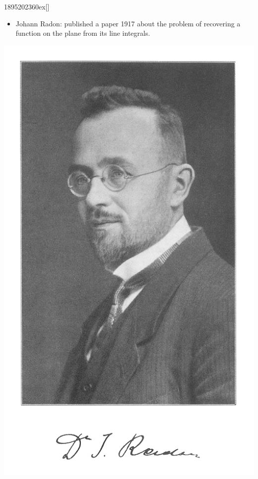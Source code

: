 \documentclass{beamer}
\begin{document}
\begin{frame}
	\begin{chronology}[20]{1895}{2023}{60ex}[\textwidth]

\end{chronology}
	\vspace{0.3cm}
	\begin{itemize}
		\item Johann Radon: published a paper 1917 about the problem of recovering a function on the plane from its line integrals.
	\end{itemize}
	\center
		\includegraphics[scale=0.15]{media/Johann_Radon.png}

\end{frame}
\end{document}
